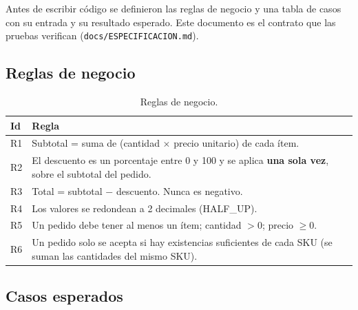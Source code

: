\documentclass[11pt,a4paper]{article}
\begin{document}
Antes de escribir código se definieron las reglas de negocio y una tabla de casos con su entrada y su
resultado esperado. Este documento es el contrato que las pruebas verifican
(\texttt{docs/ESPECIFICACION.md}).

\subsection{Reglas de negocio}

\begin{table}[H]
\centering
\begin{tabularx}{\textwidth}{@{}l L@{}}
\toprule
\textbf{Id} & \textbf{Regla}\\
\midrule
R1 & Subtotal = suma de (cantidad $\times$ precio unitario) de cada ítem.\\
R2 & El descuento es un porcentaje entre 0 y 100 y se aplica \textbf{una sola vez}, sobre el subtotal del pedido.\\
R3 & Total = subtotal $-$ descuento. Nunca es negativo.\\
R4 & Los valores se redondean a 2 decimales (HALF\_UP).\\
R5 & Un pedido debe tener al menos un ítem; cantidad $> 0$; precio $\geq 0$.\\
R6 & Un pedido solo se acepta si hay existencias suficientes de cada SKU (se suman las cantidades del mismo SKU).\\
\bottomrule
\end{tabularx}
\caption{Reglas de negocio.}
\label{tab:reglas}
\end{table}

\subsection{Casos esperados}
\end{document}
